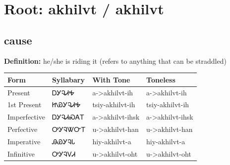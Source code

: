 \documentclass{article}%
\begin{document}
%
\normalsize%
\section*{Root: akhilvt / akhilvt}%
\subsection*{cause}%
\textbf{Definition: }%
he/she is riding it (refers to anything that can be straddled)%
\\[0.5em]%
\begin{tabular}{|l|l|l|l|}%
\hline%
\textbf{Form}&\textbf{Syllabary}&\textbf{With Tone}&\textbf{Toneless}\\%
\hline%
Present&ᎠᎩᎸᏗᎭ&a{-}>akhilvt{-}ih&a{-}>akhilvt{-}ih\\%
1st Present&ᏥᏯᎩᎸᏗᎭ&tsiy{-}akhilvt{-}ih&tsiy{-}akhilvt{-}ih\\%
Imperfective&ᎠᎩᎸᏗᏍᎪᎢ&a{-}>akhilvt{-}ihsk&a{-}>akhilvt{-}ihsk\\%
Perfective&ᎤᎩᎸᏔᏅᎢ&u{-}>akhilvt{-}han&u{-}>akhilvt{-}han\\%
Imperative&ᎯᏯᎩᎸᏓ&hiy{-}akhilvt{-}a&hiy{-}akhilvt{-}a\\%
Infinitive&ᎤᎩᎸᏙᏗ&u{-}>akhilvt{-}oht&u{-}>akhilvt{-}oht\\%
\hline%
\end{tabular}%
\\[1em]%
\end{document}
